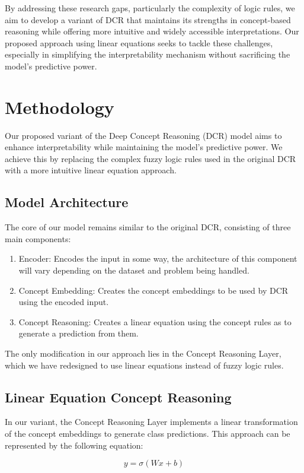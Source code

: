 \documentclass[sigconf, nonacm]{acmart}
\begin{document}
By addressing these research gaps, particularly the complexity of logic rules, we aim to develop a variant of DCR that maintains its strengths in concept-based reasoning while offering more intuitive and widely accessible interpretations. Our proposed approach using linear equations seeks to tackle these challenges, especially in simplifying the interpretability mechanism without sacrificing the model's predictive power.

\section{Methodology}
Our proposed variant of the Deep Concept Reasoning (DCR) model aims to enhance interpretability while maintaining the model's predictive power. We achieve this by replacing the complex fuzzy logic rules used in the original DCR with a more intuitive linear equation approach.

\subsection{Model Architecture}
The core of our model remains similar to the original DCR, consisting of three main components:
\begin{enumerate}
    \item Encoder: Encodes the input in some way, the architecture of this component will vary depending on the dataset and problem being handled.
    \item Concept Embedding: Creates the concept embeddings to be used by DCR using the encoded input.
    \item Concept Reasoning: Creates a linear equation using the concept rules as to generate a prediction from them.
\end{enumerate}

The only modification in our approach lies in the Concept Reasoning Layer, which we have redesigned to use linear equations instead of fuzzy logic rules.

\subsection{Linear Equation Concept Reasoning}
In our variant, the Concept Reasoning Layer implements a linear transformation of the concept embeddings to generate class predictions. This approach can be represented by the following equation:

\begin{equation}
    y = \sigma(Wx + b)
\end{equation}
\end{document}
